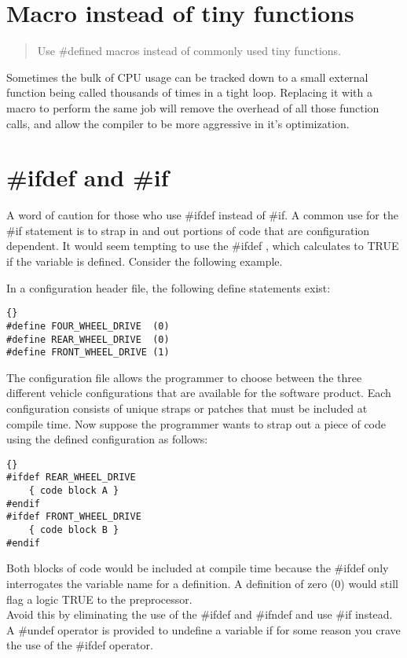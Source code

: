 \documentclass{report}
\begin{document}
\section{Macro instead of tiny functions}
\begin{quote}
Use \#defined macros instead of commonly used tiny functions.
\end{quote}
Sometimes the bulk of CPU usage can be tracked down to a small external function being called thousands of times in a tight loop. Replacing it with a macro to perform the same job will remove the overhead of all those function calls, and allow the compiler to be more aggressive in it's optimization.


\section{\#ifdef and \#if}
A word of caution for those who use \#ifdef instead of \#if. A common use for the \#if statement is to strap in and out portions of code that are configuration dependent. It would seem tempting to use the \#ifdef , which calculates to TRUE if the variable is defined. Consider the following example.

In a configuration header file, the following define statements exist: 
\begin{lstlisting}{}
#define FOUR_WHEEL_DRIVE  (0)
#define REAR_WHEEL_DRIVE  (0)
#define FRONT_WHEEL_DRIVE (1)
\end{lstlisting}
The configuration file allows the programmer to choose between the three different vehicle configurations that are available for the software product. Each configuration consists of unique straps or patches that must be included at compile time. Now suppose the programmer wants to strap out a piece of code using the defined configuration as follows: 
\begin{lstlisting}{}
#ifdef REAR_WHEEL_DRIVE
    { code block A }
#endif
#ifdef FRONT_WHEEL_DRIVE
    { code block B }
#endif
\end{lstlisting}
Both blocks of code would be included at compile time because the \#ifdef only interrogates the variable name for a definition. A definition of zero (0) would still flag a logic TRUE to the preprocessor.\\
Avoid this by eliminating the use of the \#ifdef and \#ifndef and use \#if instead. A \#undef operator is provided to undefine a variable if for some reason you crave the use of the \#ifdef operator. 
\end{document}
